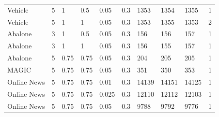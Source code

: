 \begin{tabular}{llllllllll}
Vehicle & 5 & 1 & 0.5 & 0.05 & 0.3 & 1353 & 1354 & 1355 & 1 \\
Vehicle & 5 & 1 & 1 & 0.05 & 0.3 & 1353 & 1355 & 1353 & 2 \\
Abalone & 3 & 1 & 0.5 & 0.05 & 0.3 & 156 & 156 & 157 & 1 \\
Abalone & 3 & 1 & 1 & 0.05 & 0.3 & 156 & 155 & 157 & 1 \\
Abalone & 5 & 0.75 & 0.75 & 0.05 & 0.3 & 204 & 205 & 205 & 1 \\
MAGIC & 5 & 0.75 & 0.75 & 0.05 & 0.3 & 351 & 350 & 353 & 1 \\
Online News & 5 & 0.75 & 0.75 & 0.01 & 0.3 & 14139 & 14151 & 14125 & 1 \\
Online News & 5 & 0.75 & 0.75 & 0.025 & 0.3 & 12110 & 12112 & 12103 & 1 \\
Online News & 5 & 0.75 & 0.75 & 0.05 & 0.3 & 9788 & 9792 & 9776 & 1 \\
\end{tabular}
